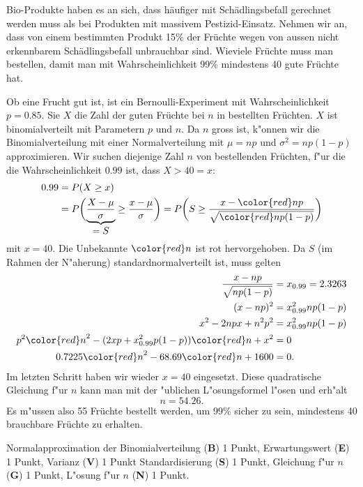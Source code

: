 Bio-Produkte haben es an sich, dass häufiger mit Schädlingsbefall gerechnet
werden muss als bei Produkten mit massivem Pestizid-Einsatz.
Nehmen wir an, dass von einem bestimmten Produkt 15\% der Früchte wegen von
aussen nicht erkennbarem Schädlingsbefall unbrauchbar sind.
Wieviele Früchte muss man bestellen, damit man mit Wahrscheinlichkeit 99\%
mindestens 40 gute Früchte hat.


\begin{loesung}
Ob eine Frucht gut ist, ist ein Bernoulli-Experiment mit Wahrscheinlichkeit
$p=0.85$.
Sie $X$ die Zahl der guten Früchte bei $n$ in bestellten Früchten.
$X$ ist binomialverteilt mit Parametern $p$ und $n$.
Da $n$ gross ist, k"onnen wir die Binomialverteilung mit einer
Normalverteilung mit $\mu=np$ und $\sigma^2=np(1-p)$ approximieren.
Wir suchen diejenige Zahl $n$ von bestellenden Früchten, f"ur
die die Wahrscheinlichkeit $0.99$ ist, dass $X>40 =x$:
\begin{align*}
0.99
&=
P(X\ge x)\\
&=
P\biggl(\underbrace{\frac{X-\mu}{\sigma}}_{\displaystyle=S}\ge \frac{x-\mu}{\sigma}\biggr)
=
P\biggl(S\ge \frac{x-{\color{red}n}p}{\sqrt{{\color{red}n}p(1-p)}}\biggr)
\end{align*}
mit $x=40$.
Die Unbekannte $\color{red}n$ ist rot hervorgehoben.
Da $S$ (im Rahmen der N"aherung) standardnormalverteilt ist, muss
gelten
\begin{align*}
\frac{x-np}{\sqrt{np(1-p)}}
&=
x_{0.99}=2.3263
\\
(x-np)^2
&=
x_{0.99}^2np(1-p)
\\
x^2-2npx+n^2p^2
&=
x_{0.99}^2np(1-p)
\\
p^2{\color{red}n}^2
-
(2xp+x_{0.99}^2p(1-p)) {\color{red}n}
+
x^2
&=0
\\
0.7225 {\color{red}n}^2 -68.69 {\color{red}n} + 1600
&= 
0.
\end{align*}
Im letzten Schritt haben wir wieder $x=40$ eingesetzt.
Diese quadratische Gleichung f"ur $n$ kann man mit der "ublichen
L"osungsformel l"osen und erh"alt
\[
n=54.26.
\]
Es m"ussen also 55 Früchte bestellt werden, um 99\% sicher zu sein,
mindestens 40 brauchbare Früchte zu erhalten.
\end{loesung}

\begin{bewertung}
Normalapproximation der Binomialverteilung ({\bf B}) 1 Punkt,
Erwartungswert ({\bf E}) 1 Punkt,
Varianz ({\bf V}) 1 Punkt
Standardisierung ({\bf S}) 1 Punkt,
Gleichung f"ur $n$ ({\bf G}) 1 Punkt,
L"osung f"ur $n$ ({\bf N}) 1 Punkt.
\end{bewertung}
